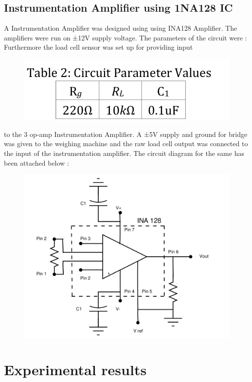 \documentclass[12pt]{article}
\begin{document}
\subsection{Instrumentation Amplifier using 1NA128 IC}
A Instrumentation Amplifier was designed using using INA128 Amplifier.
The amplifiers were run on ±12V supply voltage. The parameters of the
circuit were : Furthermore the load cell sensor was set up for providing input
\begin{figure}
\centering
\includegraphics[scale = 0.3]{table2.png}
\end{figure}
to the 3 op-amp Instrumentation Amplifier. A ±5V supply and ground for
bridge was given to the weighing machine and the raw load cell output was
connected to the input of the instrumentation amplifier. The circuit diagram
for the same has been attached below :
\newpage
\begin{figure}
\centering
\includegraphics[scale = 0.3]{ins_amp_1na128.png}
\end{figure}


\section{Experimental results}
\end{document}
